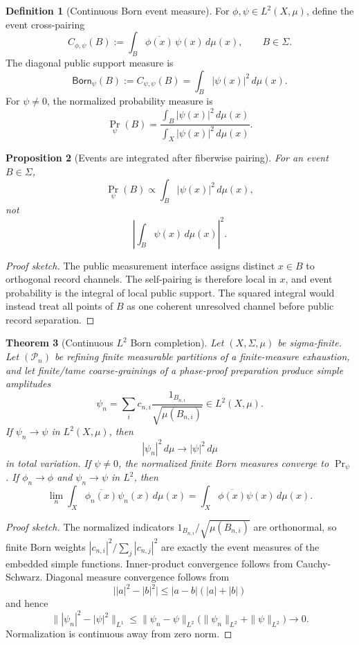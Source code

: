 \documentclass[11pt]{article}
\theoremstyle{plain}
\newtheorem{theorem}{Theorem}[section]
\newtheorem{proposition}[theorem]{Proposition}
\theoremstyle{definition}
\newtheorem{definition}[theorem]{Definition}
\theoremstyle{remark}
\newenvironment{proofsketch}{\begin{proof}[Proof sketch]}{\end{proof}}
\begin{document}
\begin{definition}[Continuous Born event measure]
For \(\phi,\psi\in L^2(X,\mu)\), define the event cross-pairing
\[
C_{\phi,\psi}(B):=\int_B\overline{\phi(x)}\,\psi(x)\,d\mu(x),
\qquad B\in\Sigma.
\]
The diagonal public support measure is
\[
\mathsf{Born}_\psi(B):=C_{\psi,\psi}(B)
=\int_B|\psi(x)|^2\,d\mu(x).
\]
For \(\psi\ne0\), the normalized probability measure is
\[
\Pr_\psi(B)=
\frac{\int_B|\psi(x)|^2\,d\mu(x)}
{\int_X|\psi(x)|^2\,d\mu(x)}.
\]
\end{definition}

\begin{proposition}[Events are integrated after fiberwise pairing]
For an event \(B\in\Sigma\),
\[
\Pr_\psi(B)\propto \int_B|\psi(x)|^2\,d\mu(x),
\]
not
\[
\left|\int_B\psi(x)\,d\mu(x)\right|^2.
\]
\end{proposition}

\begin{proofsketch}
The public measurement interface assigns distinct \(x\in B\) to orthogonal record channels. The self-pairing is therefore local in \(x\), and event probability is the integral of local public support. The squared integral would instead treat all points of \(B\) as one coherent unresolved channel before public record separation.
\end{proofsketch}

\begin{theorem}[Continuous \(L^2\) Born completion]
Let \((X,\Sigma,\mu)\) be sigma-finite. Let \((\mathcal{P}_n)\) be refining finite measurable partitions of a finite-measure exhaustion, and let finite/tame coarse-grainings of a phase-proof preparation produce simple amplitudes
\[
\psi_n=\sum_i c_{n,i}\frac{1_{B_{n,i}}}{\sqrt{\mu(B_{n,i})}}
\in L^2(X,\mu).
\]
If \(\psi_n\to\psi\) in \(L^2(X,\mu)\), then
\[
|\psi_n|^2\,d\mu \to |\psi|^2\,d\mu
\]
in total variation. If \(\psi\ne0\), the normalized finite Born measures converge to \(\Pr_\psi\). If \(\phi_n\to\phi\) and \(\psi_n\to\psi\) in \(L^2\), then
\[
\lim_n\int_X\overline{\phi_n(x)}\psi_n(x)\,d\mu(x)
=
\int_X\overline{\phi(x)}\psi(x)\,d\mu(x).
\]
\end{theorem}

\begin{proofsketch}
The normalized indicators \(1_{B_{n,i}}/\sqrt{\mu(B_{n,i})}\) are orthonormal, so finite Born weights \(|c_{n,i}|^2/\sum_j|c_{n,j}|^2\) are exactly the event measures of the embedded simple functions. Inner-product convergence follows from Cauchy-Schwarz. Diagonal measure convergence follows from
\[
\bigl||a|^2-|b|^2\bigr|\le |a-b|(|a|+|b|)
\]
and hence
\[
\||\psi_n|^2-|\psi|^2\|_{L^1}
\le
\|\psi_n-\psi\|_{L^2}
\bigl(\|\psi_n\|_{L^2}+\|\psi\|_{L^2}\bigr)\to0.
\]
Normalization is continuous away from zero norm.
\end{proofsketch}
\end{document}

